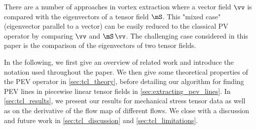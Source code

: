 %
There are a number of approaches in vortex extraction where a vector field $\vv$
is compared with the eigenvectors of a tensor field $\mS$.
%
This "mixed case" (eigenvector parallel to a vector) can be easily reduced to
the classical PV operator by comparing $\vv$ and $\mS\,\vv$.
%
The challenging case considered in this paper is the comparison of the
eigenvectors of two tensor fields.

%
In the following, we first give an overview of related work and introduce the
notation used throughout the paper.
%
We then give some theoretical properties of the PEV operator in
\autoref{sec:tcl_theory}, before detailing our algorithm for finding PEV lines in
piecewise linear tensor fields in \autoref{sec:extracting_pev_lines}.
%
In \autoref{sec:tcl_results}, we present our results for mechanical stress tensor
data as well as on the derivative of the flow map of different flows.
%
We close with a discussion and future work in \autoref{sec:tcl_discussion} and
\autoref{sec:tcl_limitations}.
%

